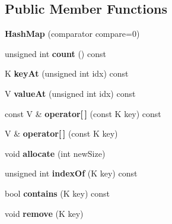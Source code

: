 \subsection*{Public Member Functions}
\begin{DoxyCompactItemize}
\item 
\hypertarget{class_hash_map_a0b42a9214e1d10a9d9ca3631108136c2}{}{\bfseries Hash\+Map} (comparator compare=0)\label{class_hash_map_a0b42a9214e1d10a9d9ca3631108136c2}

\item 
\hypertarget{class_hash_map_a7d6a983573e5e82d11cb5025ef647766}{}unsigned int {\bfseries count} () const \label{class_hash_map_a7d6a983573e5e82d11cb5025ef647766}

\item 
\hypertarget{class_hash_map_a5070fc6cee92fec011d76f7031a6b274}{}K {\bfseries key\+At} (unsigned int idx) const \label{class_hash_map_a5070fc6cee92fec011d76f7031a6b274}

\item 
\hypertarget{class_hash_map_aec6f25ebf692fad067a29d275aa9baf8}{}V {\bfseries value\+At} (unsigned int idx) const \label{class_hash_map_aec6f25ebf692fad067a29d275aa9baf8}

\item 
\hypertarget{class_hash_map_a42b684810281db5ed6c7a5ba6a925424}{}const V \& {\bfseries operator\mbox{[}$\,$\mbox{]}} (const K key) const \label{class_hash_map_a42b684810281db5ed6c7a5ba6a925424}

\item 
\hypertarget{class_hash_map_a24680bf5f24f1a562203be77f384ccc0}{}V \& {\bfseries operator\mbox{[}$\,$\mbox{]}} (const K key)\label{class_hash_map_a24680bf5f24f1a562203be77f384ccc0}

\item 
\hypertarget{class_hash_map_a8a1a7a52d83d17407a3fdca25d99df5f}{}void {\bfseries allocate} (int new\+Size)\label{class_hash_map_a8a1a7a52d83d17407a3fdca25d99df5f}

\item 
\hypertarget{class_hash_map_a9f3ea677a801d751ca58bc4315d4d4d8}{}unsigned int {\bfseries index\+Of} (K key) const \label{class_hash_map_a9f3ea677a801d751ca58bc4315d4d4d8}

\item 
\hypertarget{class_hash_map_a5d2ae7130ed966f4538f3d23e544e747}{}bool {\bfseries contains} (K key) const \label{class_hash_map_a5d2ae7130ed966f4538f3d23e544e747}

\item 
\hypertarget{class_hash_map_a78fdd35d77ed013c141a09138339455d}{}void {\bfseries remove} (K key)\label{class_hash_map_a78fdd35d77ed013c141a09138339455d}


\end{DoxyCompactItemize}
